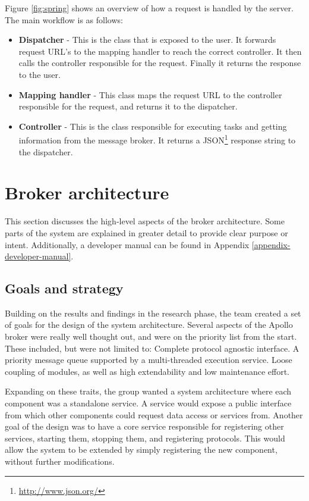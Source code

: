 Figure \ref{fig:spring} shows an overview of how a request is handled by the server. The main workflow is as follows:

\clearpage

\begin{itemize}
    \item\textbf{Dispatcher} -  This is the class that is exposed to the user. It forwards request URL's to the mapping handler to reach the correct controller. It then calls the controller responsible for the request. Finally it returns the response to the user. 
    \item\textbf{Mapping handler} - This class maps the request URL to the controller responsible for the request, and returns it to the dispatcher. 
    \item\textbf{Controller} - This is the class responsible for executing tasks and getting information from the message broker. It returns a JSON\footnote{\url{http://www.json.org/}} response string to the dispatcher.  
\end{itemize}

\section{Broker architecture}
\label{sec:architecture_and_implementation-broker_architecture}

This section discusses the high-level aspects of the broker architecture. Some parts of the system are explained in greater detail to provide clear purpose or intent. Additionally, a developer manual can be found in Appendix \ref{appendix-developer-manual}.

\subsection{Goals and strategy}
\label{subsec:architecture_and_implementation-broker_architecture-goals_and_strategy}

Building on the results and findings in the research phase, the team created a set of goals for the design of the system architecture. Several aspects of the Apollo broker were really well thought out, and were on the priority list from the start. These included, but were not limited to: Complete protocol agnostic interface. A priority message queue supported by a multi-threaded execution service. Loose coupling of modules, as well as high extendability and low maintenance effort.

Expanding on these traits, the group wanted a system architecture where each component was a standalone service. A service would expose a public interface from which other components could request data access or services from. Another goal of the design was to have a core service responsible for registering other services, starting them, stopping them, and registering protocols. This would allow the system to be extended by simply registering the new component, without further modifications.

